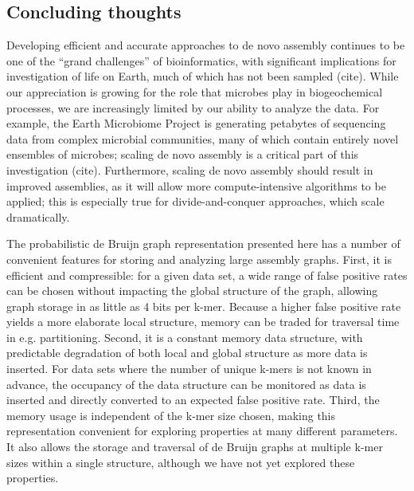 \documentclass{pnastwo}
\begin{document}
\begin{article}
\subsection{Concluding thoughts}


Developing efficient and accurate approaches to de novo assembly
continues to be one of the ``grand challenges'' of bioinformatics,
with significant implications for investigation of life on Earth, much
of which has not been sampled (cite).  While our appreciation is
growing for the role that microbes play in biogeochemical processes,
we are increasingly limited by our ability to analyze the data.  For
example, the Earth Microbiome Project is generating petabytes of
sequencing data from complex microbial communities, many of which
contain entirely novel ensembles of microbes; scaling de novo assembly
is a critical part of this investigation (cite).  Furthermore, scaling
de novo assembly should result in improved assemblies, as it will
allow more compute-intensive algorithms to be applied; this is
especially true for divide-and-conquer approaches, which scale
dramatically.

The probabilistic de Bruijn graph representation presented here has a
number of convenient features for storing and analyzing large assembly
graphs.  First, it is efficient and compressible: for a given data
set, a wide range of false positive rates can be chosen without
impacting the global structure of the graph, allowing graph storage in
as little as 4 bits per k-mer.  Because a higher false positive rate
yields a more elaborate local structure, memory can be traded for
traversal time in e.g. partitioning.  Second, it is a constant memory
data structure, with predictable degradation of both local and global
structure as more data is inserted.  For data sets where the number of
unique k-mers is not known in advance, the occupancy of the data
structure can be monitored as data is inserted and directly converted
to an expected false positive rate.  Third, the memory usage is
independent of the k-mer size chosen, making this representation
convenient for exploring properties at many different parameters.  It
also allows the storage and traversal of de Bruijn graphs at multiple
k-mer sizes within a single structure, although we have not yet
explored these properties.


\end{article}
\end{document}
